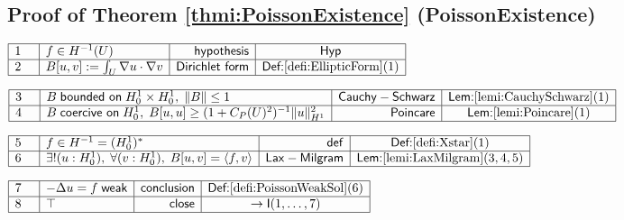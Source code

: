 \documentclass[11pt,reqno]{amsart}
\begin{document}
	\subsection*{Proof of Theorem \protect\ref{thmi:PoissonExistence} (\textsf{PoissonExistence})}
	\noindent$\begin{array}{|m{0.5cm}|l|r|c|}
	\hline
	1 & f\in H^{-1}(U) & \mathsf{hypothesis} & \mathsf{Hyp} \\ \hline
	2 & B[u,v]:=\int_{U}\nabla u\cdot\nabla v & \mathsf{Dirichlet\ form} & \textsf{Def:}\ref{defi:EllipticForm}(1) \\ \hline
	\end{array}$
	\par\nointerlineskip\noindent$\begin{array}{|m{0.5cm}|l|r|c|}
	\hline
	3 & B\;\mathsf{bounded\ on}\;H_{0}^{1}\times H_{0}^{1},\;\|B\|\le1 & \mathsf{Cauchy-Schwarz} & \textsf{Lem:}\ref{lemi:CauchySchwarz}(1) \\ \hline
	4 & B\;\mathsf{coercive\ on}\;H_{0}^{1},\;B[u,u]\ge(1+C_{P}(U)^{2})^{-1}\|u\|_{H^{1}}^{2} & \mathsf{Poincare} & \textsf{Lem:}\ref{lemi:Poincare}(1) \\ \hline
	\end{array}$
	\par\nointerlineskip\noindent$\begin{array}{|m{0.5cm}|l|r|c|}
	\hline
	5 & f\in H^{-1}=(H_{0}^{1})^{*} & \mathsf{def} & \textsf{Def:}\ref{defi:Xstar}(1) \\ \hline
	6 & \exists! (u:H_{0}^{1}),\;\forall (v:H_{0}^{1}),\;B[u,v]=\langle f,v\rangle & \mathsf{Lax-Milgram} & \textsf{Lem:}\ref{lemi:LaxMilgram}(3,4,5) \\ \hline
	\end{array}$
	\par\nointerlineskip\noindent$\begin{array}{|m{0.5cm}|l|r|c|}
	\hline
	7 & -\Delta u=f\;\mathsf{weak} & \mathsf{conclusion} & \textsf{Def:}\ref{defi:PoissonWeakSol}(6) \\ \hline
	8 & \top & \mathsf{close} & \to\mathsf{I}(1,\dots,7) \\ \hline
	\end{array}$
	\medskip
	
\end{document}
